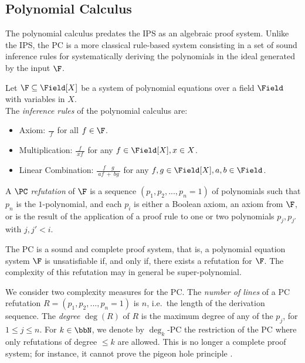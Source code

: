 \documentclass[a4paper,UKenglish,cleveref, autoref, thm-restate]{lipics-v2021}
\begin{document}
	\subsection{Polynomial Calculus}
	The polynomial calculus \cite{groebner} predates the IPS as an algebraic proof system. Unlike the IPS, the PC is a more classical rule-based system consisting in a set of sound inference rules for systematically deriving the polynomials in the ideal generated by the input $\F$. 
	\begin{definition}[Polynomial Calculus (PC)]
		Let $\F \subseteq \Field[X]$ be a system of polynomial equations over a field $\Field$
		with variables in $X$. \\
		The \textit{inference rules} of the polynomial calculus are:
		\begin{itemize}
			\item Axiom: {\Large$\frac{}{~f~}$} for all $f \in \F$.
			\item Multiplication: {\Large$\frac{f}{~xf~}$} for any $f\in \Field[X], x\in X$.
			\item Linear Combination: {\Large$\frac{f\quad g}{~af ~+~ bg~}$}
			for any $f,g \in \Field[X], a,b \in \Field$.
		\end{itemize}
		A \textit{$\PC$ refutation} of $\F$ is a sequence $(p_1,p_2 , ... ,p_n = 1)$ of polynomials such that $p_n$ is the $1$-polynomial, and each $p_i$ is either a Boolean axiom, an axiom from $\F$, or is the result of the application of a proof rule to one or two polynomials $p_j, p_{j'}$ with $j,j' < i$.
	\end{definition}
	The PC  is a sound and complete proof system, that is, a polynomial equation system $\F$ is unsatisfiable if, and only if, there exists a refutation for $\F$. The complexity of this refutation may in general be super-polynomial.
	
	We consider two complexity measures for the PC. The \textit{number of lines} of a PC refutation
	$R = (p_1,p_2 , ... ,p_n = 1)$ is $n$, i.e.\ the length of the derivation sequence. 
	The \textit{degree} $\deg(R)$ of $R$ is the maximum degree of any of the $p_j$, for $1 \leq j \leq n$.
	For $k \in \bbN$, we denote by $\deg_k$-PC the restriction of the PC where only refutations of degree $\leq k$ are allowed. This is no longer a complete proof system; for instance, it cannot prove the pigeon hole principle \cite{razborov1998lower}.
\end{document}
